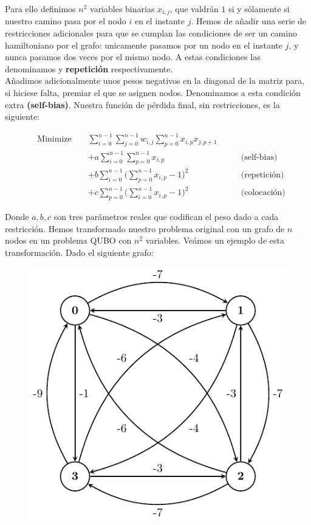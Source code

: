 \documentclass[11pt]{article}
\begin{document}
Para ello definimos $n^2$ variables binarias $x_{i,j}$, que valdrán $1$ si y sólamente si nuestro camino pasa por el nodo $i$ en el instante $j$. Hemos de añadir una serie de restricciones adicionales para que se cumplan las condiciones de ser un camino hamiltoniano por el grafo: unicamente pasamos por un nodo en el instante $j$, y nunca pasamos dos veces por el mismo nodo. A estas condiciones las denominamos  y \textbf{repetición} respectivamente. \\

Añadimos adicionalmente unos pesos negativos en la diagonal de la matriz para, si hiciese falta, premiar el que se asignen nodos. Denominamos a esta condición extra \textbf{(self-bias)}. Nuestra función de pérdida final, sin restricciones, es la siguiente:

\begin{equation}
	\begin{alignedat}{3}
		& \text{Minimize }	&& \sum_{i=0}^{n-1} \sum_{j=0}^{n-1} w_{i,j}\sum_{p=0}^{n-1} x_{i,p}x_{j,p+1} & \\
		& && + a \sum_{i=0}^{n-1} \sum_{p=0}^{n-1} x_{i,p} & \qquad \text{(self-bias)} \\
		& && + b \sum_{i=0}^{n-1} \Big( \sum_{p=0}^{n-1} x_{i,p} - 1 \Big)^2 & \qquad \text{(repetición)} \\
		& && + c \sum_{p=0}^{n-1} \Big( \sum_{i=0}^{n-1} x_{i,p} - 1 \Big)^2 & \qquad \text{(colocación)}
	\end{alignedat}
\end{equation}

Donde $a,b,c$ son tres parámetros reales que codifican el peso dado a cada restricción. Hemos transformado nuestro problema original con un grafo de $n$ nodos en un problema QUBO con $n^2$ variables. Veámos un ejemplo de esta transformación. Dado el siguiente grafo:

\begin{figure}[H]
	\includegraphics[scale=1.1]{figures/salesman-example.pdf}
	\centering
	\label{fig:salesman-example}
\end{figure}
\end{document}
